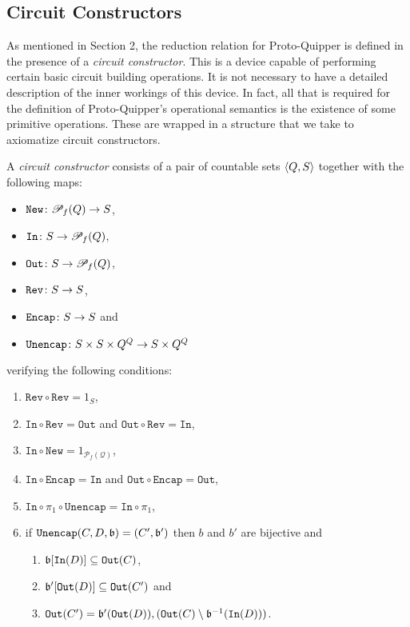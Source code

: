 \documentclass[twoside]{article}
\begin{document}
\subsection{Circuit Constructors}

As mentioned in Section 2, the reduction relation for 
Proto-Quipper is defined in the presence of a \emph{circuit
constructor}. This is a device capable of 
performing certain basic circuit building operations. It is 
not necessary to have a detailed description of the inner 
workings of this device. In fact, all that is required for 
the definition of Proto-Quipper's operational semantics is 
the existence of some primitive operations. These are wrapped 
in a structure that we take to axiomatize circuit constructors. 

\begin{definition}
\label{circuit_constructor}
A \emph{circuit constructor} consists of a pair of countable sets $\langle Q,S\rangle$ 
together with the following maps:
\begin{itemize}
  \item $\mathtt{New}\colon {\mathscr{P}}_f(Q) \to S$,
  \item $\mathtt{In}\colon S\to {\mathscr{P}}_f(Q)$,
  \item $\mathtt{Out}\colon S\to {\mathscr{P}}_f(Q)$,
  \item $\mathtt{Rev}\colon S \to S$,
  \item $\mathtt{Encap}\colon S \to  S$ and
  \item $\mathtt{Unencap}\colon S\times S\times Q^Q \to S \times Q^Q$
\end{itemize}
verifying the following conditions:
\begin{enumerate}
  \item $\mathtt{Rev}\circ\mathtt{Rev}=1_S$,
  \item $\mathtt{In}\circ\mathtt{Rev}= \mathtt{Out}$ and 
        $\mathtt{Out}\circ\mathtt{Rev}= \mathtt{In}$\label{in_out_rev},
  \item $\mathtt{In}\circ\mathtt{New} =1_{\mathcal{P}_f(\mathcal{Q})}$,
  \item $\mathtt{In}\circ \mathtt{Encap} =\mathtt{In}$ and $\mathtt{Out}\circ \mathtt{Encap} =\mathtt{Out}$,
  \item $\mathtt{In}\circ\pi_1\circ\mathtt{Unencap}=\mathtt{In}\circ\pi_1$,\label{Unencap_In}
  \item if $\mathtt{Unencap} (C,D,\mathfrak{b})=(C',\mathfrak{b}')$ then $b$ and $b'$ are bijective and\label{Unencap_cond}
    \begin{enumerate}
      \item $\mathfrak{b}[\mathtt{In}(D)]\subseteq \mathtt{Out} (C)$,\label{Unencap_cond_1}
      \item $\mathfrak{b}'[\mathtt{Out}(D)]\subseteq\mathtt{Out}(C')$ and\label{Unencap_cond_2}
      \item $\mathtt{Out}(C')=\mathfrak{b}'(\mathtt{Out}(D)),(\mathtt{Out}(C)\setminus\mathfrak{b}^{-1}(\mathtt{In}(D)))$.\label{Unencap_cond_3}
    \end{enumerate}
\end{enumerate}
\end{definition}
\end{document}
